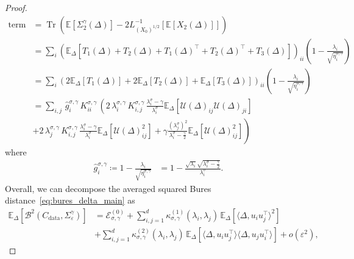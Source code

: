 \documentclass[11pt]{article}
\newcommand{\tr}[1]{\operatorname{Tr}\left({#1}\right)}
\newcommand{\eqdef}{\coloneqq}
\newcommand{\EE}{\mathbb{E}}
\begin{document}
\begin{proof}
\begin{align*}
 \text{term C}  &= \tr{\EE[\Sigma^\gamma_2(\Delta)]-2L_{(X_0)^{1/2}}^{-1}\left[\EE[X_2(\Delta)]\right]} \\ 
 &= \sum_i \left( \EE_{\Delta}\left[T_1(\Delta) + T_2(\Delta) + T_1(\Delta)^\top + T_2(\Delta)^\top + T_3(\Delta)  \right] \right)_{ii} \left(1 - \frac{\lambda_i}{ \sqrt{\eta^{\sigma,\gamma}_i}} \right)\\
 &= \sum_i \left( 2\EE_{\Delta}[T_1(\Delta)]  + 2\EE_{\Delta}[T_2(\Delta)] + \EE_{\Delta}[T_3(\Delta)] \right)_{ii} \left(1 - \frac{\lambda_i}{ \sqrt{\eta^{\sigma,\gamma}_i}} \right)
 \\
 &= \sum_{i,j} \, \hat g^{\sigma, \gamma}_i \, K^{\sigma, \gamma}_{ii} \,\left( 
2 \,  \lambda^{\sigma, \gamma}_{i}\, K^{\sigma, \gamma}_{i,j} \, \frac{\lambda^\sigma_i - \gamma}{\lambda^\sigma_i } \EE_{\Delta}\left[\mathcal{U}(\Delta)_{ij} \mathcal{U}(\Delta)_{ji}\right] \right. \\
&+ 2 \,  \lambda^{\sigma, \gamma}_{j} \, K^{\sigma, \gamma}_{i,j} \,\frac{\lambda^\sigma_i - \gamma}{\lambda^\sigma_i } \EE_{\Delta}\left[ \mathcal{U}(\Delta)_{ij}^2\right] + \left. \gamma 
 \frac{(\lambda^\sigma_j)^2}{\lambda^\sigma_i - \frac{\gamma}{2}} \EE_{\Delta}\left[ \mathcal{U}(\Delta)_{ij}^2\right]  \right) \nonumber
\end{align*}
where 
\begin{align} \label{eq:g_ij}
\hat g^{\sigma,\gamma}_i \eqdef 1 - \frac{\lambda_i}{\sqrt{\eta^{\sigma,\gamma}_i}}  &= 1 - \frac{\sqrt{\lambda_i}\sqrt{ \lambda_i^\sigma - \frac{\gamma}{2}}}{\lambda_i^\sigma}.
\end{align}
Overall, we can decompose the averaged squared Bures distance~\eqref{eq:bures_delta_main} as 
\begin{equation*}
\begin{split}
\EE_{\Delta}\left[\mathcal{B}^2( C_\mathrm{data}, \Sigma_\varepsilon^\gamma)\right] &=  \mathcal{E}^{(0)}_{\sigma, \gamma} +
\sum_{i,j=1}^d \kappa^{(1)}_{\sigma, \gamma}(\lambda_i, \lambda_j) \, \EE_{\Delta}\left[\langle \Delta, u_iu_j^\top \rangle^2\right] \\
&+ \sum_{i,j=1}^d  \kappa^{(2)}_{\sigma, \gamma}(\lambda_i, \lambda_j) \, \EE_{\Delta}\left[\langle \Delta, u_iu_j^\top \rangle \langle \Delta, u_ju_i^\top \rangle \right]  + o(\varepsilon^2),
\end{split}

\end{equation*}
\end{proof}
\end{document}
